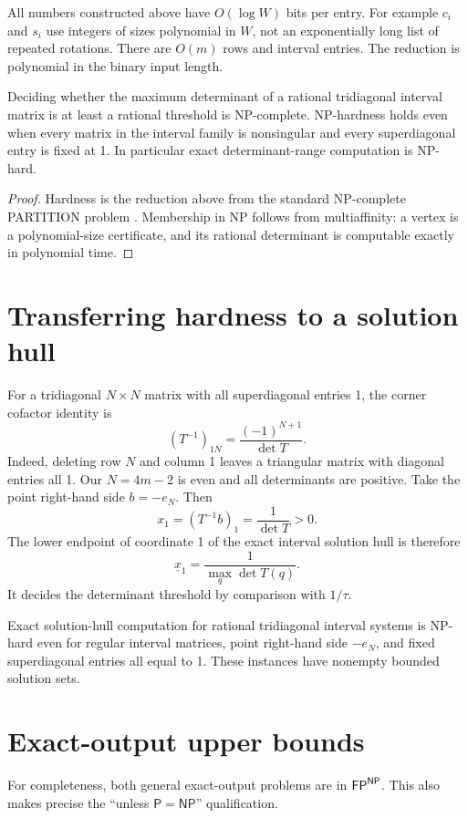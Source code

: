 All numbers constructed above have $O(\log W)$ bits per entry. For example $c_i$ and $s_i$ use integers of sizes polynomial in $W$, not an exponentially long list of repeated rotations. There are $O(m)$ rows and interval entries. The reduction is polynomial in the binary input length.
\begin{theorem}\label{thm:det}
Deciding whether the maximum determinant of a rational tridiagonal interval matrix is at least a rational threshold is NP-complete. NP-hardness holds even when every matrix in the interval family is nonsingular and every superdiagonal entry is fixed at 1. In particular exact determinant-range computation is NP-hard.
\end{theorem}
\begin{proof}
Hardness is the reduction above from the standard NP-complete PARTITION problem \cite{karp}. Membership in NP follows from multiaffinity: a vertex is a polynomial-size certificate, and its rational determinant is computable exactly in polynomial time.
\end{proof}
\section{Transferring hardness to a solution hull}
For a tridiagonal $N\times N$ matrix with all superdiagonal entries 1, the corner cofactor identity is
\[
 (T^{-1})_{1N}=\frac{(-1)^{N+1}}{\det T}.
\]
Indeed, deleting row $N$ and column 1 leaves a triangular matrix with diagonal entries all 1. Our $N=4m-2$ is even and all determinants are positive. Take the point right-hand side $b=-e_N$. Then
\[
 x_1=(T^{-1}b)_1=\frac1{\det T}>0.
\]
The lower endpoint of coordinate 1 of the exact interval solution hull is therefore
\[
 \underline{x}_1=\frac1{\max_q\det T(q)}.
\]
It decides the determinant threshold by comparison with $1/\tau$.
\begin{theorem}\label{thm:hull}
Exact solution-hull computation for rational tridiagonal interval systems is NP-hard even for regular interval matrices, point right-hand side $-e_N$, and fixed superdiagonal entries all equal to 1. These instances have nonempty bounded solution sets.
\end{theorem}
\section{Exact-output upper bounds}
For completeness, both general exact-output problems are in $\mathsf{FP}^{\mathsf{NP}}$. This also makes precise the ``unless $\mathsf P=\mathsf{NP}$'' qualification.

